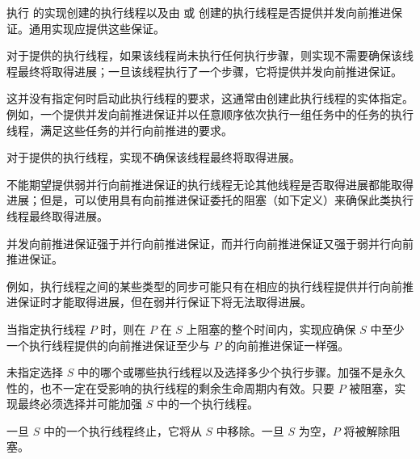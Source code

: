 \pnum
{}执行  的实现创建的执行线程以及由  或  创建的执行线程是否提供并发向前推进保证。通用实现应提供这些保证。


\pnum
{}%
对于提供的执行线程，如果该线程尚未执行任何执行步骤，则实现不需要确保该线程最终将取得进展；一旦该线程执行了一个步骤，它将提供并发向前推进保证。

\pnum
\begin{note}
这并没有指定何时启动此执行线程的要求，这通常由创建此执行线程的实体指定。例如，一个提供并发向前推进保证并以任意顺序依次执行一组任务中的任务的执行线程，满足这些任务的并行向前推进的要求。
\end{note}

\pnum
{}%
对于提供的执行线程，实现不确保该线程最终将取得进展。

\pnum
\begin{note}
不能期望提供弱并行向前推进保证的执行线程无论其他线程是否取得进展都能取得进展；但是，可以使用具有向前推进保证委托的阻塞（如下定义）来确保此类执行线程最终取得进展。
\end{note}

\pnum
并发向前推进保证强于并行向前推进保证，而并行向前推进保证又强于弱并行向前推进保证。
\begin{note}
例如，执行线程之间的某些类型的同步可能只有在相应的执行线程提供并行向前推进保证时才能取得进展，但在弱并行保证下将无法取得进展。
\end{note}

\pnum
{}%
当指定执行线程 $P$ 时，则在 $P$ 在 $S$ 上阻塞的整个时间内，实现应确保 $S$ 中至少一个执行线程提供的向前推进保证至少与 $P$ 的向前推进保证一样强。
\begin{note}
未指定选择 $S$ 中的哪个或哪些执行线程以及选择多少个执行步骤。加强不是永久性的，也不一定在受影响的执行线程的剩余生命周期内有效。只要 $P$ 被阻塞，实现最终必须选择并可能加强 $S$ 中的一个执行线程。
\end{note}
一旦 $S$ 中的一个执行线程终止，它将从 $S$ 中移除。一旦 $S$ 为空，$P$ 将被解除阻塞。

